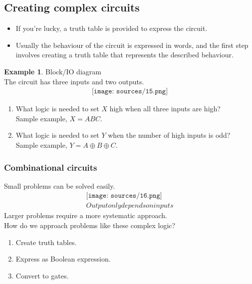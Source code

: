 \documentclass[12pt]{article}
\theoremstyle{definition}
\newtheorem{example}{Example}[section]
\begin{document}
\subsection{Creating complex circuits}
\begin{itemize}
    \item If you're lucky, a truth table is provided to express the circuit.
    \item Usually the behaviour of the circuit is expressed in words, and the first step involves creating a truth table that represents the described behaviour.
\end{itemize}
\begin{example} Block/IO diagram\\
    The circuit has three inputs and two outputs.
    \begin{align*}
        \texttt{[image: sources/15.png]}
    \end{align*}
    \begin{enumerate}
        \item What logic is needed to set $X$ high when all three inputs are high?\\Sample example, $X=ABC$.
        \item What logic is needed to set $Y$ when the number of high inputs is odd?\\Sample example, $Y=A\oplus B\oplus C$.
    \end{enumerate}
\end{example}
\subsubsection{Combinational circuits}
Small problems can be solved easily.
\begin{align*}
    \texttt{[image: sources/16.png]}\\
    Output only depends on inputs
\end{align*}
Larger problems require a more systematic approach.\\
How do we approach problems like these complex logic?
\begin{enumerate}
    \item Create truth tables.
    \item Express as Boolean expression.
    \item Convert to gates.
\end{enumerate}
\end{document}
